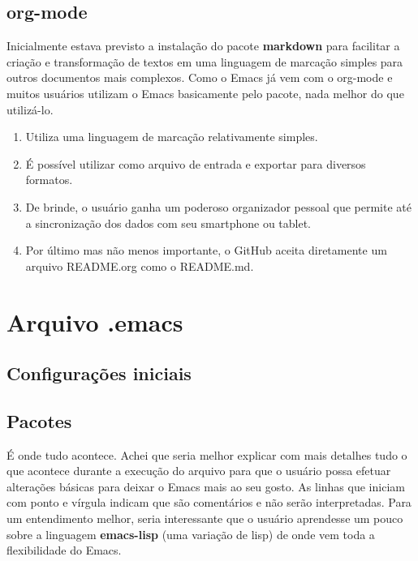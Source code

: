 \documentclass[]{article}
\providecommand{\tightlist}{%
  \setlength{\itemsep}{0pt}\setlength{\parskip}{0pt}}
\begin{document}
\subsection{org-mode}\label{org-mode}

Inicialmente estava previsto a instalação do pacote \textbf{markdown}
para facilitar a criação e transformação de textos em uma linguagem de
marcação simples para outros documentos mais complexos. Como o Emacs já
vem com o org-mode e muitos usuários utilizam o Emacs basicamente pelo
pacote, nada melhor do que utilizá-lo.

\begin{enumerate}
\tightlist
\item
  Utiliza uma linguagem de marcação relativamente simples.
\item
  É possível utilizar como arquivo de entrada e exportar para diversos
  formatos.
\item
  De brinde, o usuário ganha um poderoso organizador pessoal que permite
  até a sincronização dos dados com seu smartphone ou tablet.
\item
  Por último mas não menos importante, o GitHub aceita diretamente um
  arquivo README.org como o README.md.
\end{enumerate}

\section{Arquivo .emacs}\label{arquivo-.emacs}

\subsection{Configurações iniciais}\label{configurauxe7uxf5es-iniciais}

\subsection{Pacotes}\label{pacotes}

É onde tudo acontece. Achei que seria melhor explicar com mais detalhes
tudo o que acontece durante a execução do arquivo para que o usuário
possa efetuar alterações básicas para deixar o Emacs mais ao seu gosto.
As linhas que iniciam com ponto e vírgula indicam que são comentários e
não serão interpretadas. Para um entendimento melhor, seria interessante
que o usuário aprendesse um pouco sobre a linguagem \textbf{emacs-lisp}
(uma variação de lisp) de onde vem toda a flexibilidade do Emacs.
\end{document}
